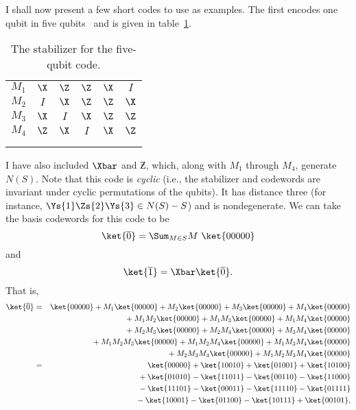 I shall now present a few short codes to use as examples.  The first
encodes one qubit in five qubits~\cite{bennett-tome,laflamme-5qubit} and is
given in table~\ref{table-5qubit}.
\begin{table}
	\centering
	\begin{tabular}{c|ccccc}
		$M_1$ & $\X$ & $\Z$ & $\Z$ & $\X$ & $I$ \\
		$M_2$ & $I$ & $\X$ & $\Z$ & $\Z$ & $\X$ \\
		$M_3$ & $\X$ & $I$ & $\X$ & $\Z$ & $\Z$ \\
		$M_4$ & $\Z$ & $\X$ & $I$ & $\X$ & $\Z$ \\
		\hline
		\low{$\Xbar$} & \low{$\X$} & \low{$\X$} & \low{$\X$} & \low{$\X$} & \low{$\X$}
		\\
		\low{$\Zbar$} & \low{$\Z$} & \low{$\Z$} & \low{$\Z$} & \low{$\Z$} & \low{$\Z$}
	\end{tabular}
	\caption{The stabilizer for the five-qubit code.}
	\label{table-5qubit}
\end{table}
I have also included $\Xbar$ and $\Zbar$, which, along with $M_1$
through $M_4$, generate $N(S)$.  Note that this code is {\em cyclic} (i.e.,
the stabilizer and codewords are invariant under cyclic permutations of
the qubits).  It has distance three (for instance, $\Ys{1} \Zs{2} \Ys{3} \in
N(S)-S$) and is nondegenerate.  We can take the basis codewords for this code
to be
\begin{equation}
	\ket{\overline{0}} = \Sum_{M \in S} M \ \ket{00000}
\end{equation}
and
\begin{equation}
	\ket{\overline{1}} = \Xbar \ket{\overline{0}}.
\end{equation}
That is,
\begin{eqnarray}
	\ket{\overline{0}} & = & \ket{00000} + M_1 \ket{00000} + M_2 \ket{00000} +
	M_3 \ket{00000} + M_4 \ket{00000} \nonumber \\
	& & \quad \mbox{} + M_1 M_2 \ket{00000} + M_1 M_3 \ket{00000} +
	M_1 M_4 \ket{00000} \nonumber \\
	& & \quad \mbox{} + M_2 M_3 \ket{00000} + M_2 M_4 \ket{00000} +
	M_3 M_4 \ket{00000} \\
	& & \quad \mbox{} + M_1 M_2 M_3 \ket{00000} + M_1 M_2 M_4 \ket{00000} +
	M_1 M_3 M_4 \ket{00000} \nonumber \\
	& & \quad \mbox{} + M_2 M_3 M_4 \ket{00000} + M_1 M_2 M_3 M_4 \ket{00000}
	\nonumber \\
	& = & \ket{00000} + \ket{10010} + \ket{01001} + \ket{10100} \nonumber \\
	& & \mbox{} + \ket{01010} - \ket{11011} - \ket{00110} - \ket{11000} \nonumber \\
	& & \mbox{} - \ket{11101} - \ket{00011} - \ket{11110} - \ket{01111} \\
	& & \mbox{} - \ket{10001} - \ket{01100} - \ket{10111} + \ket{00101}, \nonumber
\end{eqnarray}
